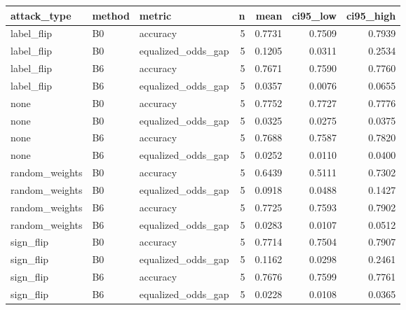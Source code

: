 \begin{tabular}{lllrrrr}
\toprule
attack\_type & method & metric & n & mean & ci95\_low & ci95\_high \\
\midrule
label\_flip & B0 & accuracy & 5 & 0.7731 & 0.7509 & 0.7939 \\
label\_flip & B0 & equalized\_odds\_gap & 5 & 0.1205 & 0.0311 & 0.2534 \\
label\_flip & B6 & accuracy & 5 & 0.7671 & 0.7590 & 0.7760 \\
label\_flip & B6 & equalized\_odds\_gap & 5 & 0.0357 & 0.0076 & 0.0655 \\
none & B0 & accuracy & 5 & 0.7752 & 0.7727 & 0.7776 \\
none & B0 & equalized\_odds\_gap & 5 & 0.0325 & 0.0275 & 0.0375 \\
none & B6 & accuracy & 5 & 0.7688 & 0.7587 & 0.7820 \\
none & B6 & equalized\_odds\_gap & 5 & 0.0252 & 0.0110 & 0.0400 \\
random\_weights & B0 & accuracy & 5 & 0.6439 & 0.5111 & 0.7302 \\
random\_weights & B0 & equalized\_odds\_gap & 5 & 0.0918 & 0.0488 & 0.1427 \\
random\_weights & B6 & accuracy & 5 & 0.7725 & 0.7593 & 0.7902 \\
random\_weights & B6 & equalized\_odds\_gap & 5 & 0.0283 & 0.0107 & 0.0512 \\
sign\_flip & B0 & accuracy & 5 & 0.7714 & 0.7504 & 0.7907 \\
sign\_flip & B0 & equalized\_odds\_gap & 5 & 0.1162 & 0.0298 & 0.2461 \\
sign\_flip & B6 & accuracy & 5 & 0.7676 & 0.7599 & 0.7761 \\
sign\_flip & B6 & equalized\_odds\_gap & 5 & 0.0228 & 0.0108 & 0.0365 \\
\bottomrule
\end{tabular}
